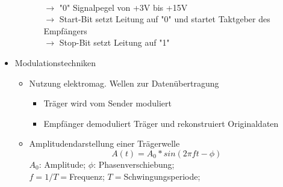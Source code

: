 \documentclass{scrreprt}
\begin{document}
\begin{itemize}
\begin{itemize}
\begin{itemize}
				\\$\rightarrow$ "0" Signalpegel von +3V bis +15V
				\\$\rightarrow$ Start-Bit setzt Leitung auf "0" und startet Taktgeber des Empfängers
				\\$\rightarrow$ Stop-Bit setzt Leitung auf "1"
			\end{itemize}
	      \end{itemize}
	\item Modulationstechniken
	\begin{itemize}
		\item Nutzung elektromag. Wellen zur Datenübertragung
		\begin{itemize}
			\item Träger wird vom Sender moduliert
			\item Empfänger demoduliert Träger und rekonstruiert Originaldaten
		\end{itemize}
		\item Amplitudendarstellung einer Trägerwelle
		$$A(t) = A_{0}*sin(2\pi ft -\phi )$$
		$A_{0}$: Amplitude; $\phi$: Phasenverschiebung;
		\\$f=1/T=$Frequenz; $T=$Schwingungsperiode;
	\end{itemize}
\end{itemize}
\end{document}

